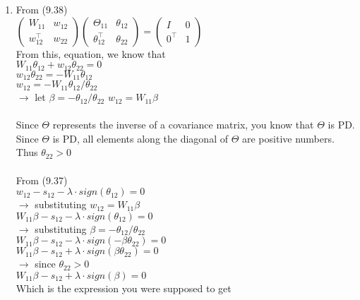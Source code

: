\documentclass[11pt]{article}
\begin{document}
\begin{enumerate}

\item
From (9.38)\\
$\begin{pmatrix} W_{11} & w_{12} \\ w_{12}^\top & w_{22} \end{pmatrix} \begin{pmatrix} \Theta_{11} & \theta_{12} \\ \theta_{12}^\top & \theta_{22} \end{pmatrix} = \begin{pmatrix} I & 0 \\ 0^\top & 1 \end{pmatrix}$\\
From this, equation, we know that\\
$W_{11} \theta_{12} + w_{12} \theta_{22} = 0$\\
$w_{12} \theta_{22} = -W_{11} \theta_{12}$\\
$w_{12} = -W_{11} \theta_{12}/\theta_{22}$\\
$\rightarrow$ let $\beta = -\theta_{12}/\theta_{22}$
$w_{12} = W_{11} \beta$\\
\\
Since $\Theta$ represents the inverse of a covariance matrix, you know that $\Theta$ is PD. Since $\Theta$ is PD, all elements along the diagonal of $\Theta$ are positive numbers. Thus $\theta_{22} > 0$\\
\\
From (9.37)\\
$w_{12} - s_{12} - \lambda \cdot sign(\theta_{12}) = 0$\\
$\rightarrow$ substituting $w_{12} = W_{11} \beta$\\
$W_{11} \beta - s_{12} - \lambda \cdot sign(\theta_{12}) = 0$\\
$\rightarrow$ substituting $\beta = -\theta_{12}/\theta_{22}$\\
$W_{11} \beta - s_{12} - \lambda \cdot sign(-\beta \theta_{22}) = 0$\\
$W_{11} \beta - s_{12} + \lambda \cdot sign(\beta \theta_{22}) = 0$\\
$\rightarrow$ since $\theta_{22} > 0$\\
$W_{11} \beta - s_{12} + \lambda \cdot sign(\beta) = 0$\\
Which is the expression you were supposed to get

\end{enumerate}
\end{document}
